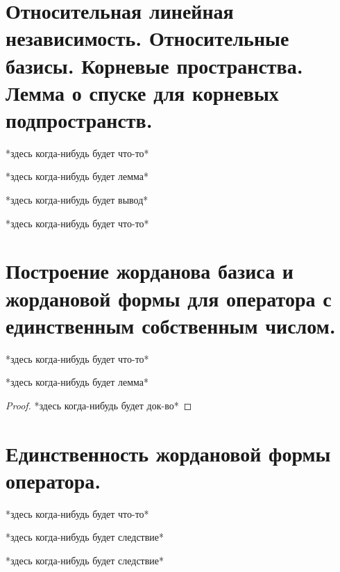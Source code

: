 \documentclass[12pt, fleqn]{article}
\begin{document}
  \section{Относительная линейная независимость. Относительные базисы. Корневые пространства. Лемма о спуске для корневых подпространств.}

  *здесь когда-нибудь будет что-то*

  \begin{lemma}[1]
    *здесь когда-нибудь будет лемма*
  \end{lemma}

  *здесь когда-нибудь будет вывод*

  *здесь когда-нибудь будет что-то*

  \section{Построение жорданова базиса и жордановой формы для оператора с единственным собственным числом.}

  *здесь когда-нибудь будет что-то*

  \begin{lemma}[1]
    *здесь когда-нибудь будет лемма*
  \end{lemma}

  \begin{proof}
    *здесь когда-нибудь будет док-во*
  \end{proof}

  \section{Единственность жордановой формы оператора.}

  *здесь когда-нибудь будет что-то*

  \begin{consequence}
    *здесь когда-нибудь будет следствие*
  \end{consequence}

  \begin{consequence}
    *здесь когда-нибудь будет следствие*
  \end{consequence}
\end{document}
